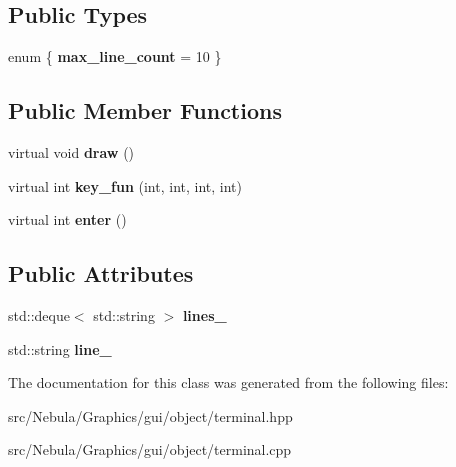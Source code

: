 \subsection*{\-Public \-Types}
\begin{DoxyCompactItemize}
\item 
enum \{ {\bfseries max\-\_\-line\-\_\-count} =  10
 \}
\end{DoxyCompactItemize}
\subsection*{\-Public \-Member \-Functions}
\begin{DoxyCompactItemize}
\item 
\hypertarget{classNeb_1_1gui_1_1object_1_1terminal_a18aa33c5c2715448fbc5d3d56a7fd4b5}{virtual void {\bfseries draw} ()}\label{classNeb_1_1gui_1_1object_1_1terminal_a18aa33c5c2715448fbc5d3d56a7fd4b5}

\item 
\hypertarget{classNeb_1_1gui_1_1object_1_1terminal_afafb6e54a1fac406cd62285789523600}{virtual int {\bfseries key\-\_\-fun} (int, int, int, int)}\label{classNeb_1_1gui_1_1object_1_1terminal_afafb6e54a1fac406cd62285789523600}

\item 
\hypertarget{classNeb_1_1gui_1_1object_1_1terminal_a14a48b79f63f90089a8cf74f8a31677c}{virtual int {\bfseries enter} ()}\label{classNeb_1_1gui_1_1object_1_1terminal_a14a48b79f63f90089a8cf74f8a31677c}

\end{DoxyCompactItemize}
\subsection*{\-Public \-Attributes}
\begin{DoxyCompactItemize}
\item 
\hypertarget{classNeb_1_1gui_1_1object_1_1terminal_aaa3062edc24c1ae158f94c1685c1051f}{std\-::deque$<$ std\-::string $>$ {\bfseries lines\-\_\-}}\label{classNeb_1_1gui_1_1object_1_1terminal_aaa3062edc24c1ae158f94c1685c1051f}

\item 
\hypertarget{classNeb_1_1gui_1_1object_1_1terminal_aace520ed4f87afbe4266bb5c42bdf9da}{std\-::string {\bfseries line\-\_\-}}\label{classNeb_1_1gui_1_1object_1_1terminal_aace520ed4f87afbe4266bb5c42bdf9da}

\end{DoxyCompactItemize}


\-The documentation for this class was generated from the following files\-:\begin{DoxyCompactItemize}
\item 
src/\-Nebula/\-Graphics/gui/object/terminal.\-hpp\item 
src/\-Nebula/\-Graphics/gui/object/terminal.\-cpp\end{DoxyCompactItemize}
